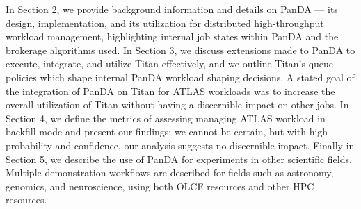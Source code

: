 





In Section 2, we provide background information and details on PanDA --- its
design, implementation, and its utilization for distributed high-throughput
workload management, highlighting internal job states within PanDA and the
brokerage algorithms used. In Section 3, we discuss extensions made to PanDA to
execute, integrate, and utilize Titan effectively, and we outline Titan's queue
policies which shape internal PanDA workload shaping decisions. A stated goal
of the integration of PanDA on Titan for ATLAS workloads was to increase the
overall utilization of Titan without having a discernible impact on other jobs.
In Section 4, we define the metrics of assessing managing ATLAS workload in
backfill mode and present our findings: we cannot be certain, but with high
probability and confidence, our analysis suggests no discernible impact.
Finally in Section 5, we describe the use of PanDA for experiments in other
scientific fields. Multiple demonstration workflows are described for fields
such as astronomy, genomics, and neuroscience, using both OLCF resources and
other HPC resources.



